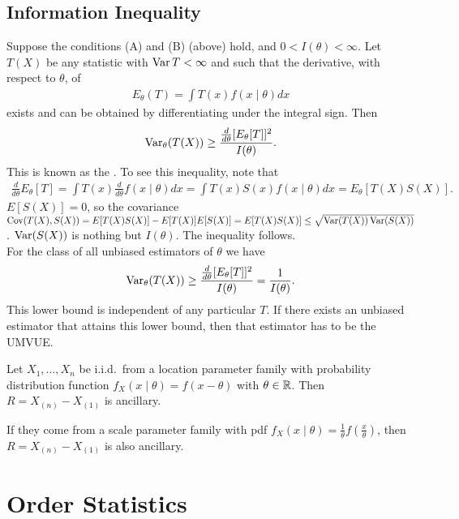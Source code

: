 \subsection{Information Inequality}
Suppose the conditions (A) and (B) (above) hold, and $0 < I(\theta) < \infty$. Let $T(X)$ be any statistic with $\operatorname{Var} T < \infty$ and such that the derivative, with respect to $\theta$, of
\begin{align}
    E_{\theta}(T) = \int T(x)f(x \mid \theta) dx
\end{align}
exists and can be obtained by differentiating under the integral sign. Then
\begin{align}
    \operatorname{Var}_{\theta}(T(X)) \geq \frac{\frac{d}{d\theta}[E_{\theta}[T]]^{2}}{I(\theta)}.
\end{align}
This is known as the . To see this inequality, note that
\begin{align}
    \frac{d}{d \theta} E_{\theta}[T] = \int T(x) \frac{d}{d\theta}f(x \mid \theta) dx = \int T(x) S(x) f(x \mid \theta) dx = E_{\theta}[T(X)S(X)].
\end{align}
$E[S(X)] = 0$, so the covariance $\operatorname{Cov}(T(X),S(X)) = E[T(X)S(X)] -E[T(X)]E[S(X)] = E[T(X)S(X)] \leq \sqrt{\operatorname{Var}(T(X)) \operatorname{Var}(S(X))}$. $\operatorname{Var}(S(X))$ is nothing but $I(\theta)$. The inequality follows.\\

For the class of all unbiased estimators of $\theta$ we have
\begin{align}
    \operatorname{Var}_{\theta}(T(X)) \geq \frac{\frac{d}{d\theta}[E_{\theta}[T]]^{2}}{I(\theta)} = \frac{1}{I(\theta)}.
\end{align}
This lower bound is independent of any particular $T$. If there exists an unbiased estimator that attains this lower bound, then that estimator has to be the UMVUE.

\begin{remark}
    Let $X_{1},\ldots,X_{n}$ be i.i.d.~from a location parameter family with probability distribution function $f_{X}(x \mid \theta) = f(x-\theta)$ with $\theta \in \mathbb{R}$. Then $R = X_{(n)}-X_{(1)}$ is ancillary.

    If they come from a scale parameter family with pdf $f_{X}(x \mid \theta) = \frac{1}{\theta}f\left(\frac{x}{\theta}\right)$, then $R = X_{(n)}-X_{(1)}$ is also ancillary.
\end{remark}

\section{Order Statistics}

